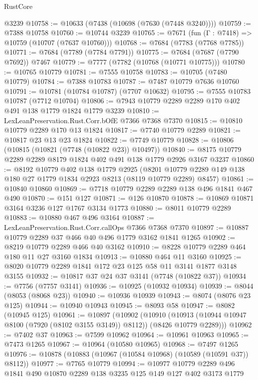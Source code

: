 \begin{lexlean}{RustCore}
\begin{coremodule}
    @3239
@10758 := @10633 (@7438 (@10698 (@7630 (@7448 @3240))))
@10759 := @7388 @10758
@10760 := @10744 @3239
@10765 := @7671 (fun (Γ : @7418) => @10759 (@10707 (@7637 @10760)))
@10768 := @7684 (@7783 (@7768 @7785))
@10771 := @7684 (@7789 (@7784 @7791))
@10775 := @7684 (@7687 (@7790 @7692)) @7467
@10779 := @7777 (@7782 (@10768 (@10771 @10775)))
@10780 := @10765 @10779
@10781 := @7555 @10758
@10783 := @10705 (@7480 @10779)
@10784 := @7388 @10783
@10787 := @7487 @10779 @7636 @10760
@10791 := @10781 (@10784 @10787) (@7707 @10632)
@10795 := @7555 @10783 @10787 (@7712 @10704)
@10806 := @7943 @10779 @2289 @2289 @170 @402 @491 @138 @1779 @1824 @1779 @3239
@10810 := LexLeanPreservation.Rust.Corr.bOfE @7366 @7368 @7370
@10815 := @10810 @10779 @2289 @170 @13 @1824
@10817 := @7740 @10779 @2289
@10821 := @10817 @23 @13 @23 @1824
@10822 := @7749 @10779
@10828 := @10806 (@10815 (@10821 (@7748 (@10822 @23)) @10497))
@10840 := @8175 @10779 @2289 @2289 @8179 @1824 @402 @491 @138 @1779 @2926 @3167 @3237
@10860 := @8192
    @10779
    @402
    @138
    @1779
    @2925
    (@8201 @10779 @2289 @149 @138 @180 @27 @1779 @1834 @2923 @8213 (@8119 @10779 @2289) @8457)
@10861 := @10840 @10860
@10869 := @7718 @10779 @2289 @2289 @138 @496 @1841 @467 @490
@10870 := @151 @127
@10871 := @126 @10870
@10878 := @10869 @10871 @3164 @3236 @127 @1767 @3134 @1773
@10880 := @8011 @10779 @2289
@10883 := @10880 @467 @496 @3164
@10887 := LexLeanPreservation.Rust.Corr.callOps @7366 @7368 @7370
@10897 := @10887 @10779 @2289 @37 @466 @40 @496 @1779 @3162 @1841 @1265
@10902 := @8219 @10779 @2289 @466 @40 @3162
@10910 := @8228 @10779 @2289 @464 @180 @11 @27 @3160 @1834
@10913 := @10880 @464 @11 @3160
@10925 := @8020 @10779 @2289 @1841 @172 @23 @125 @58 @11 @3141 @1877 @3148 @3155
@10932 := @10817 @37 @24 @37 @3141 (@7748 (@10822 @37))
@10934 := @7756 (@7757 @3141)
@10936 := @10925 (@10932 @10934)
@10939 := @8044 (@8053 (@8068 @23))
@10940 := @10936 @10939
@10943 := @8074 (@8076 @23 @125)
@10944 := @10940 @10943
@10945 := @8093 @58
@10947 := @8082 (@10945 @125)
@10961 := @10897
    (@10902
      (@10910
        (@10913 (@10944 @10947 @8100 (@7920 (@8102 @3155 @3149)) @8112))
        (@8426 @10779 @2289)))
@10962 := @7402 @37
@10963 := @7599 @10962
@10964 := @10961 @10963
@10965 := @7473 @1265
@10967 := @10964 (@10580 @10965)
@10968 := @7497 @1265
@10976 := @10878 (@10883 (@10967 (@10584 @10968) (@10589 (@10591 @37)) @8112))
@10977 := @7765 @10779
@10994 := @10977
    @10779
    @2289
    @496
    @1841
    @490
    @10870
    @2289
    @138
    @3235
    @125
    @149
    @127
    @402
    @3173
    @1779

\end{coremodule}
\end{lexlean}
